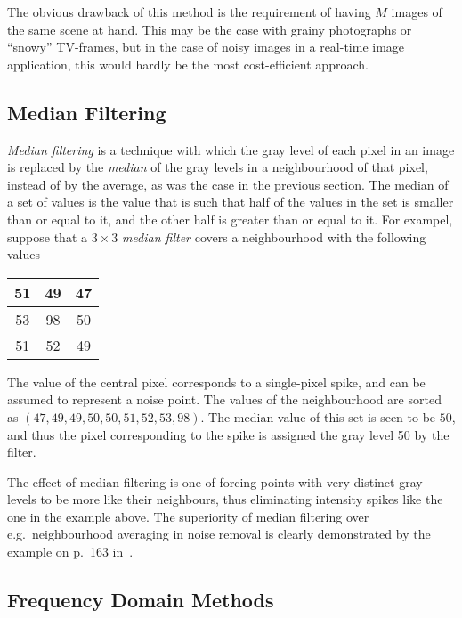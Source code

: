 The obvious drawback of this method is the requirement of having $M$
images of the same scene at hand.  This may be the case with grainy
photographs or ``snowy'' TV-frames, but in the case of noisy images in
a real-time image application, this would hardly be the most
cost-efficient approach.

\subsection{Median Filtering}
\label{image:noise:median}

{\em Median filtering\/} is a technique with which the gray level of
each pixel in an image is replaced by the {\em median\/} of the gray
levels in a neighbourhood of that pixel, instead of by the average, as
was the case in the previous section.  The median of a set of values
is the value that is such that half of the values in the set is
smaller than or equal to it, and the other half is greater than or
equal to it.  For exampel, suppose that a $3\times 3$ {\em median
  filter\/} covers a neighbourhood with the following values
\begin{center}
  \begin{tabular}{|c|c|c|} \hline
    51 & 49 & 47 \\ \hline
    53 & 98 & 50 \\ \hline
    51 & 52 & 49 \\ \hline
  \end{tabular}
\end{center}
The value of the central pixel corresponds to a single-pixel spike,
and can be assumed to represent a noise point.  The values of the
neighbourhood are sorted as $(47,49,49,50,50,51,52,53,98)$.  The
median value of this set is seen to be $50$, and thus the pixel
corresponding to the spike is assigned the gray level 50 by the
filter.

The effect of median filtering is one of forcing points with very
distinct gray levels to be more like their neighbours, thus
eliminating intensity spikes like the one in the example above.  The
superiority of median filtering over e.g.\ neighbourhood averaging in
noise removal is clearly demonstrated by the example on p.\ 163
in~\cite{digim}.

\subsection{Frequency Domain Methods}
\label{image:noise:frequency}

